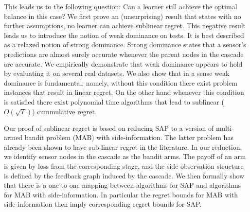 
This leads us to the following question: Can a learner still achieve the optimal balance in this case?  We first prove an (unsurprising) result that states with no further assumptions, no learner can achieve sublinear regret.
This negative result leads us to introduce the notion of weak dominance on tests. It is best described as a relaxed notion of strong dominance. Strong dominance states that a sensor's predictions are almost surely accurate whenever the parent nodes in the cascade are accurate. We empirically demonstrate that weak dominance appears to hold by evaluating it on several real datasets. We also show that in a sense weak dominance is fundamental, namely, without this condition there exist problem instances that result in linear regret. On the other hand whenever this condition is satisfied there exist polynomial time algorithms that lead to sublinear ($O(\sqrt{T})$) cummulative regret. 

Our proof of sublinear regret is based on reducing SAP to a version of multi-armed bandit problem (MAB) with side-information. The latter problem has already been shown to have sub-linear regret in the literature. In our reduction, we identify sensor nodes in the cascade as the bandit arms. %
The payoff of an arm is given by loss from the corresponding stage, and the side observation structure is defined by the feedback graph induced by the cascade. We then formally show that there is a one-to-one mapping between algorithms for SAP and algorithms for MAB with side-information. In particular the regret bounds for MAB with side-information then imply corresponding regret bounds for SAP. 

